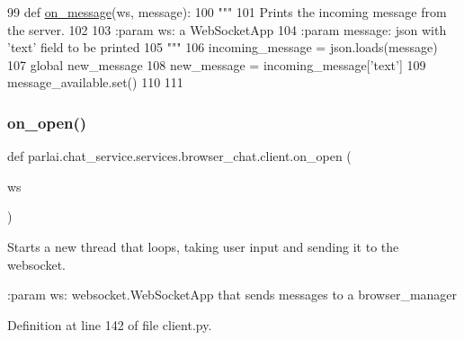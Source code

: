 \begin{DoxyCode}
99 \textcolor{keyword}{def }\hyperlink{namespaceparlai_1_1chat__service_1_1services_1_1terminal__chat_1_1client_a0ef2bb2bd3b966dcdd8402a92b999708}{on\_message}(ws, message):
100     \textcolor{stringliteral}{"""}
101 \textcolor{stringliteral}{    Prints the incoming message from the server.}
102 \textcolor{stringliteral}{}
103 \textcolor{stringliteral}{    :param ws: a WebSocketApp}
104 \textcolor{stringliteral}{    :param message: json with 'text' field to be printed}
105 \textcolor{stringliteral}{    """}
106     incoming\_message = json.loads(message)
107     \textcolor{keyword}{global} new\_message
108     new\_message = incoming\_message[\textcolor{stringliteral}{'text'}]
109     message\_available.set()
110 
111 
\end{DoxyCode}
\mbox{\label{namespaceparlai_1_1chat__service_1_1services_1_1browser__chat_1_1client_a04f3d9d0fe1870baaa214de4064afb17}} 
\subsubsection{\texorpdfstring{on\+\_\+open()}{on\_open()}}
{\footnotesize\ttfamily def parlai.\+chat\+\_\+service.\+services.\+browser\+\_\+chat.\+client.\+on\+\_\+open (\begin{DoxyParamCaption}\item[{}]{ws }\end{DoxyParamCaption})}

\begin{DoxyVerb}Starts a new thread that loops, taking user input and sending it to the websocket.

:param ws: websocket.WebSocketApp that sends messages to a browser_manager
\end{DoxyVerb}
 

Definition at line 142 of file client.\+py.


